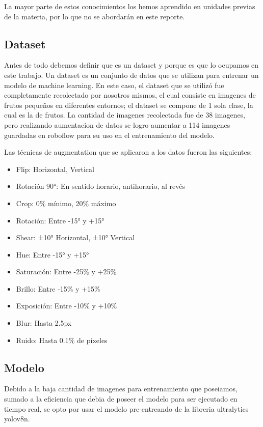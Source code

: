 \documentclass[conference]{IEEEtran}
\begin{document}
La mayor parte de estos conocimientos los hemos aprendido en unidades previas de la materia, por lo que no se abordarán en este reporte.

\subsection{Dataset}
Antes de todo debemos definir que es un dataset y porque es que lo ocupamos en este trabajo.
Un dataset es un conjunto de datos que se utilizan para entrenar un modelo de machine learning. En este caso, el dataset que se utilizó fue completamente recolectado por nosotros mismos\cite{}, el cual consiste en imagenes de frutos pequeños en diferentes entornos; el dataset se compone de 1 sola clase, la cual es la de frutos. La cantidad de imagenes recolectada fue de 38 imagenes, pero realizando aumentacion de datos se logro aumentar a 114 imagenes guardadas en roboflow\cite{} para su uso en el entrenamiento del modelo.

Las técnicas de augmentation que se aplicaron a los datos fueron las siguientes:
\begin{itemize}
    \item Flip: Horizontal, Vertical
    \item Rotación 90°: En sentido horario, antihorario, al revés
    \item Crop: 0\% mínimo, 20\% máximo
    \item Rotación: Entre -15° y +15°
    \item Shear: ±10° Horizontal, ±10° Vertical
    \item Hue: Entre -15° y +15°
    \item Saturación: Entre -25\% y +25\%
    \item Brillo: Entre -15\% y +15\%
    \item Exposición: Entre -10\% y +10\%
    \item Blur: Hasta 2.5px
    \item Ruido: Hasta 0.1\% de píxeles
\end{itemize}

\subsection{Modelo}
Debido a la baja cantidad de imagenes para entrenamiento que poseiamos, sumado a la eficiencia que debia de poseer el modelo para ser ejecutado en tiempo real, se opto por usar el modelo pre-entreando de la libreria ultralytics\cite{} yolov8n\cite{}.
\end{document}
